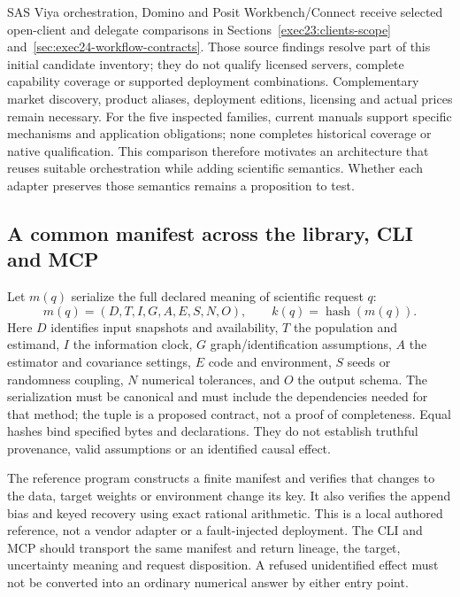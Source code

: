 SAS Viya orchestration, Domino and Posit Workbench/Connect receive selected open-client and delegate comparisons in Sections~\ref{exec23:clients-scope} and~\ref{sec:exec24-workflow-contracts}. Those source findings resolve part of this initial candidate inventory; they do not qualify licensed servers, complete capability coverage or supported deployment combinations. Complementary market discovery, product aliases, deployment editions,
licensing and actual prices remain necessary. For the five inspected families,
current manuals support specific mechanisms and application obligations;
none completes historical coverage or native qualification. This comparison
therefore motivates an architecture that reuses suitable orchestration while
adding scientific semantics. Whether each adapter preserves those semantics
remains a proposition to test.

\subsection{A common manifest across the library, CLI and MCP}

Let $m(q)$ serialize the full declared meaning of scientific request $q$:
\begin{equation}
 m(q)=(D,T,I,G,A,E,S,N,O),\qquad k(q)=\operatorname{hash}(m(q)).
 \label{exec22:workflow-manifest}
\end{equation}
Here $D$ identifies input snapshots and availability, $T$ the population and
estimand, $I$ the information clock, $G$ graph/identification assumptions,
$A$ the estimator and covariance settings, $E$ code and environment, $S$ seeds
or randomness coupling, $N$ numerical tolerances, and $O$ the output schema.
The serialization must be canonical and must include the dependencies needed
for that method; the tuple is a proposed contract, not a proof of completeness.
Equal hashes bind specified bytes and declarations. They do not establish
truthful provenance, valid assumptions or an identified causal effect.

The reference program constructs a finite manifest and verifies that changes
to the data, target weights or environment change its key. It also verifies
the append bias and keyed recovery using exact rational arithmetic. This is
a local authored reference, not a vendor adapter or a fault-injected deployment.
The CLI and MCP should transport the same manifest and return lineage, the
target, uncertainty meaning and request disposition. A refused unidentified
effect must not be converted into an ordinary numerical answer by either
entry point.~\citep{exec22_workflow_reference}


